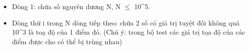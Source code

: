 \begin{itemize}
	\item     Dòng 1: chứa số nguyên dương N, N $\le$ 10^5.   
	\item     Dòng thứ i trong N dòng tiếp theo: chứa 2 số có giá trị tuyệt đối không quá 10^3 là toạ độ của 1 điểm đỏ. (Chú ý: trong bộ test các giá trị tọa độ của các điểm được cho có thể bị trùng nhau)   
\end{itemize}

\